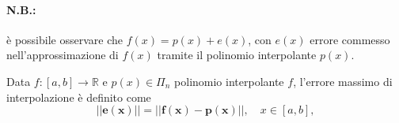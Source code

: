\paragraph{N.B.:} è possibile osservare che $f(x)=p(x)+e(x)$, con $e(x)$ errore commesso nell'approssimazione di $f(x)$ tramite il polinomio interpolante $p(x)$.

\begin{definition}
	Data $f:[a,b]\rightarrow\mathbb{R}$ e $p(x)\in\Pi_n$ polinomio interpolante $f$, l'errore massimo di interpolazione è definito come
	\begin{equation}\label{eq:errore_massimo_interpolazione}
		\boldsymbol{||e(x)||=||f(x)-p(x)||},\quad x\in [a,b],
	\end{equation}
\end{definition}

 
